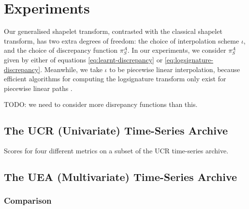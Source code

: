 \section{Experiments}
Our generalised shapelet transform, contrasted with the classical shapelet transform, has two extra degrees of freedom: the choice of interpolation scheme $\iota$, and the choice of discrepancy function $\pi^A_S$. In our experiments, we consider $\pi^A_S$ given by either of equations \eqref{eq:learnt-discrepancy} or \eqref{eq:logsignature-discrepancy}. Meanwhile, we take $\iota$ to be piecewise linear interpolation, because efficient algorithms for computing the logsignature transform only exist for piecewise linear paths \cite{signatory}.

TODO: we need to consider more disrepancy functions than this.

\subsection{The UCR (Univariate) Time-Series Archive}

\begin{table}[ht]
    \caption{Scores for four different metrics on a subset of the UCR time-series archive.}
    \label{tab:ucr_results}
    \centering
    
\end{table}


\subsection{The UEA (Multivariate) Time-Series Archive}

\subsubsection{Comparison}
\begin{table}[ht]
    \centering
    \caption{}
    \label{tab:uea_comparison_results}
    
\end{table}
%
%    
%
%    
%
%    
